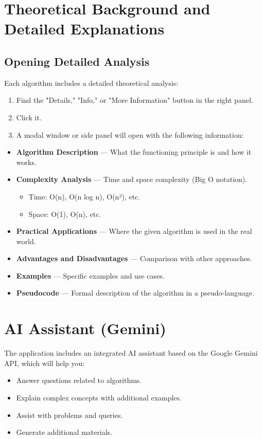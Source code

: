 \section{Theoretical Background and Detailed Explanations}

\subsection{Opening Detailed Analysis}

Each algorithm includes a detailed theoretical analysis:
\begin{enumerate}
  \item Find the "Details," "Info," or "More Information" button in the right panel.
  \item Click it.
  \item A modal window or side panel will open with the following information:
\end{enumerate}

\begin{itemize}
  \item \textbf{Algorithm Description} — What the functioning principle is and how it works.
  \item \textbf{Complexity Analysis} — Time and space complexity (Big O notation).
    \begin{itemize}
      \item Time: O(n), O(n log n), O(n²), etc.
      \item Space: O(1), O(n), etc.
    \end{itemize}
  \item \textbf{Practical Applications} — Where the given algorithm is used in the real world.
  \item \textbf{Advantages and Disadvantages} — Comparison with other approaches.
  \item \textbf{Examples} — Specific examples and use cases.
  \item \textbf{Pseudocode} — Formal description of the algorithm in a pseudo-language.
\end{itemize}

\section{AI Assistant (Gemini)}

The application includes an integrated AI assistant based on the Google Gemini API, which will help you:

\begin{itemize}
  \item Answer questions related to algorithms.
  \item Explain complex concepts with additional examples.
  \item Assist with problems and queries.
  \item Generate additional materials.
\end{itemize}

